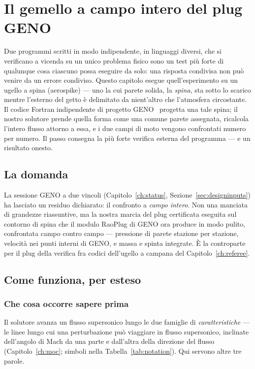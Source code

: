 \chapter{Il gemello a campo intero del plug GENO}
\label{ch:genotwin}

Due programmi scritti in modo indipendente, in linguaggi diversi,
che si verificano a vicenda su un unico problema fisico sono un test
più forte di qualunque cosa ciascuno possa eseguire da solo: una
risposta condivisa non può venire da un errore condiviso. Questo
capitolo esegue quell'esperimento su un ugello a spina (aerospike)
--- uno la cui parete solida, la \emph{spina}, sta sotto lo scarico
mentre l'esterno del getto è delimitato da nient'altro che
l'atmosfera circostante. Il codice Fortran indipendente di progetto
GENO~\cite{geno} progetta una tale spina; il nostro solutore prende
quella forma come una comune parete assegnata, ricalcola l'intero
flusso attorno a essa, e i due campi di moto vengono confrontati
numero per numero. Il passo consegna la più forte verifica esterna
del programma --- e un risultato onesto.

\section{La domanda}

La sessione GENO a due vincoli (Capitolo~\ref{ch:status},
Sezione~\ref{sec:designinputs}) ha lasciato un residuo dichiarato:
il confronto a \emph{campo intero}. Non una manciata di grandezze
riassuntive, ma la nostra marcia del plug certificata eseguita sul
contorno di spina che il modulo RaoPlug di GENO ora produce in modo
pulito, confrontata campo contro campo --- pressione di parete
stazione per stazione, velocità nei punti interni di GENO, e massa e
spinta integrate. È la controparte per il plug della verifica fra
codici dell'ugello a campana del Capitolo~\ref{ch:referee}.

\section{Come funziona, per esteso}

\subsection{Che cosa occorre sapere prima}

Il solutore avanza un flusso supersonico lungo le due famiglie di
\emph{caratteristiche} --- le linee lungo cui una perturbazione può
viaggiare in flusso supersonico, inclinate dell'angolo di Mach da una
parte e dall'altra della direzione del flusso (Capitolo~\ref{ch:moc};
simboli nella Tabella~\ref{tab:notation}). Qui servono altre tre
parole.

